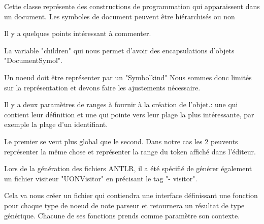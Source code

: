 \documentclass[
    iict, %
    il, %
]{heig-tb}
\begin{document}
Cette classe représente des constructions de programmation qui apparaissent dans un document.
Les symboles de document peuvent être hiérarchisés ou non

Il y a quelques points intéressant à commenter.

La variable "children" qui nous permet d'avoir des encapsulations d'objets "DocumentSymol".

Un noeud doit être représenter par un "Symbolkind" %
Nous sommes donc limités sur la représentation et devons faire les ajustements nécessaire.

Il y a deux paramètres de ranges à fournir à la création de l'objet.: une qui contient leur définition et une qui pointe vers leur plage la plus intéressante, par exemple la plage d'un identifiant.

Le premier se veut plus global que le second.
Dans notre cas les 2 peuvents représenter la même chose et représenter la range du token affiché dans l'éditeur.






Lors de la génération des fichiers ANTLR, il a été spécifié de générer également un fichier visiteur "UONVisitor" en précisant le tag "- visitor".

Cela va nous créer un fichier qui contiendra une interface définissant une fonction pour chaque type de noeud de note parseur et retournera un résultat de type générique.
Chacune de ses fonctions prends comme paramètre son contexte.
\end{document}
